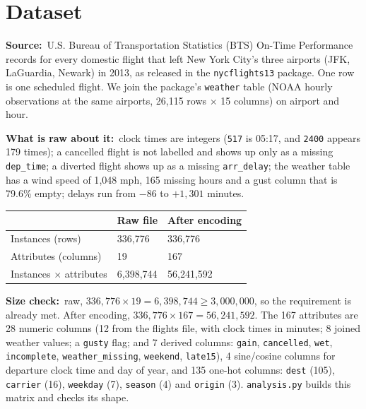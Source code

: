 \documentclass[10pt,a4paper,twocolumn]{article}
\newcommand{\eg}[1]{\textcolor{eg}{#1}}
\newcommand{\field}[2]{\textbf{#1}~\eg{#2}\par}
\newcommand{\code}[1]{\texttt{#1}}
\begin{document}
\section{Dataset}

\field{Source:}{U.S. Bureau of Transportation Statistics (BTS) On-Time Performance records for
every domestic flight that left New York City's three airports (JFK, LaGuardia, Newark) in 2013,
as released in the \code{nycflights13} package. One row is one scheduled flight. We join the
package's \code{weather} table (NOAA hourly observations at the same airports, 26{,}115 rows
$\times$ 15 columns) on airport and hour.}

\field{What is raw about it:}{clock times are integers (\code{517} is 05:17, and \code{2400}
appears 179 times); a cancelled flight is not labelled and shows up only as a missing
\code{dep\_time}; a diverted flight shows up as a missing \code{arr\_delay}; the weather table has
a wind speed of 1{,}048 mph, 165 missing hours and a gust column that is 79.6\% empty; delays run
from $-86$ to $+1{,}301$ minutes.}

{\small
\begin{tabularx}{\linewidth}{@{}L{3.0cm} Y Y@{}}
\toprule
 & \textbf{Raw file} & \textbf{After encoding} \\
\midrule
Instances (rows) & 336{,}776 & 336{,}776 \\
Attributes (columns) & 19 & 167 \\
Instances $\times$ attributes & 6{,}398{,}744 & 56{,}241{,}592 \\
\bottomrule
\end{tabularx}}

\field{Size check:}{raw, $336{,}776\times19=6{,}398{,}744\ge3{,}000{,}000$, so the requirement is
already met. After encoding, $336{,}776\times167=56{,}241{,}592$. The 167 attributes are 28
numeric columns (12 from the flights file, with clock times in minutes; 8 joined weather values;
a \code{gusty} flag; and 7 derived columns: \code{gain}, \code{cancelled}, \code{wet},
\code{incomplete}, \code{weather\_missing}, \code{weekend}, \code{late15}), 4 sine/cosine columns
for departure clock time and day of year, and 135 one-hot columns: \code{dest} (105),
\code{carrier} (16), \code{weekday} (7), \code{season} (4) and \code{origin} (3).
\code{analysis.py} builds this matrix and checks its shape.}
\end{document}

